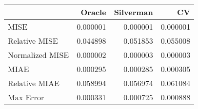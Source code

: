 \begin{tabular}{lrrr}
  \hline
 & Oracle & Silverman & CV \\ 
  \hline
MISE & 0.000001 & 0.000001 & 0.000001 \\ 
  Relative MISE & 0.044898 & 0.051853 & 0.055008 \\ 
  Normalized MISE & 0.000002 & 0.000003 & 0.000003 \\ 
  MIAE & 0.000295 & 0.000285 & 0.000305 \\ 
  Relative MIAE & 0.058994 & 0.056974 & 0.061084 \\ 
  Max Error & 0.000331 & 0.000725 & 0.000888 \\ 
   \hline
\end{tabular}
